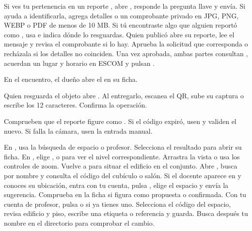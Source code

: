 Si ves tu pertenencia en un reporte , abre , responde la pregunta llave y envía. Si ayuda a identificarla, agrega detalles o un comprobante privado en JPG, PNG, WEBP o PDF de menos de 10 MB. Si tú encontraste algo que alguien reportó como , usa  e indica dónde lo resguardas.
Quien publicó abre su reporte, lee el mensaje y revisa el comprobante si lo hay. Aprueba la solicitud que corresponda o recházala si los detalles no coinciden. Una vez aprobada, ambas partes consultan , acuerdan un lugar y horario en ESCOM y pulsan .
\begin{pasos}
\item En el encuentro, el dueño abre el  en su ficha.
\item Quien resguarda el objeto abre . Al entregarlo, escanea el QR, sube su captura o escribe los 12 caracteres. Confirma la operación.
\item Comprueben que el reporte figure como . Si el código expiró, usen  y validen el nuevo. Si falla la cámara, usen la entrada manual.
\end{pasos}

En , usa la búsqueda de espacio o profesor. Selecciona el resultado para abrir su ficha. En , elige ,  o  para ver el nivel correspondiente. Arrastra la vista o usa los controles de zoom. Vuelve a  para situar el edificio en el conjunto.
Abre , busca por nombre y consulta el código del cubículo o salón. Si el docente aparece en  y conoces su ubicación, entra con tu cuenta, pulsa , elige el espacio y envía la sugerencia. Comprueba en la ficha si figura como propuesta o confirmada.
Con tu cuenta de profesor, pulsa  o  si ya tienes uno. Selecciona el código del espacio, revisa edificio y piso, escribe una etiqueta o referencia y guarda. Busca después tu nombre en el directorio para comprobar el cambio.


